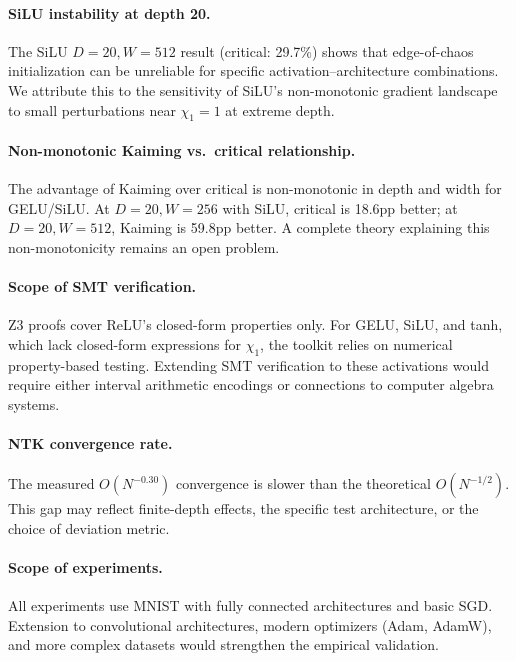 \documentclass[10pt]{article}
\begin{document}
\paragraph{SiLU instability at depth 20.}
The SiLU $D\!=\!20, W\!=\!512$ result (critical: 29.7\%) shows that edge-of-chaos initialization can be unreliable for specific activation--architecture combinations.
We attribute this to the sensitivity of SiLU's non-monotonic gradient landscape to small perturbations near $\chi_1 = 1$ at extreme depth.

\paragraph{Non-monotonic Kaiming vs.\ critical relationship.}
The advantage of Kaiming over critical is non-monotonic in depth and width for GELU/SiLU.
At $D\!=\!20, W\!=\!256$ with SiLU, critical is 18.6pp better; at $D\!=\!20, W\!=\!512$, Kaiming is 59.8pp better.
A complete theory explaining this non-monotonicity remains an open problem.

\paragraph{Scope of SMT verification.}
Z3 proofs cover ReLU's closed-form properties only.
For GELU, SiLU, and tanh, which lack closed-form expressions for $\chi_1$, the toolkit relies on numerical property-based testing.
Extending SMT verification to these activations would require either interval arithmetic encodings or connections to computer algebra systems.

\paragraph{NTK convergence rate.}
The measured $O(N^{-0.30})$ convergence is slower than the theoretical $O(N^{-1/2})$.
This gap may reflect finite-depth effects, the specific test architecture, or the choice of deviation metric.

\paragraph{Scope of experiments.}
All experiments use MNIST with fully connected architectures and basic SGD.
Extension to convolutional architectures, modern optimizers (Adam, AdamW), and more complex datasets would strengthen the empirical validation.

\end{document}
